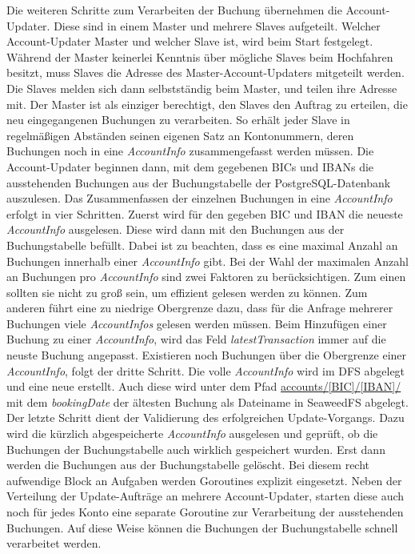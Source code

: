 \documentclass[12pt,oneside,a4paper,parskip]{scrbook}
\begin{document}
Die weiteren Schritte zum Verarbeiten der Buchung übernehmen die Account-Updater. Diese sind in einem Master und mehrere Slaves aufgeteilt. Welcher Account-Updater Master und welcher Slave ist, wird beim Start festgelegt. Während der Master keinerlei Kenntnis über mögliche Slaves beim Hochfahren besitzt, muss Slaves die  Adresse des Master-Account-Updaters mitgeteilt werden. Die Slaves melden sich dann selbstständig beim Master, und teilen ihre Adresse mit. Der Master ist als einziger berechtigt, den Slaves den Auftrag zu erteilen, die neu eingegangenen Buchungen zu verarbeiten. So  erhält jeder Slave in regelmäßigen Abständen seinen eigenen Satz an Kontonummern, deren Buchungen noch in eine \textit{AccountInfo} zusammengefasst werden müssen. Die Account-Updater beginnen dann, mit dem gegebenen BICs und IBANs die ausstehenden Buchungen aus der Buchungstabelle der PostgreSQL-Datenbank auszulesen. Das Zusammenfassen der einzelnen Buchungen in eine \textit{AccountInfo} erfolgt in vier Schritten. Zuerst wird für den gegeben BIC und IBAN die neueste \textit{AccountInfo} ausgelesen. Diese wird dann mit den Buchungen aus der Buchungstabelle befüllt. Dabei ist zu beachten, dass es eine maximal Anzahl an Buchungen innerhalb einer \textit{AccountInfo} gibt. Bei der Wahl der maximalen Anzahl an Buchungen pro \textit{AccountInfo} sind zwei Faktoren zu berücksichtigen. Zum einen sollten sie nicht zu groß sein, um effizient gelesen werden zu können. Zum anderen führt eine zu niedrige Obergrenze dazu, dass für die Anfrage mehrerer Buchungen viele \textit{AccountInfos} gelesen werden müssen. Beim Hinzufügen einer Buchung zu einer \textit{AccountInfo}, wird das Feld \textit{latestTransaction} immer auf die neuste Buchung angepasst. Existieren noch Buchungen über die Obergrenze einer \textit{AccountInfo}, folgt der dritte Schritt. Die volle \textit{AccountInfo} wird im DFS abgelegt und eine neue erstellt. Auch diese wird unter dem Pfad \url{accounts/[BIC]/[IBAN]/} mit dem \textit{bookingDate} der ältesten Buchung als Dateiname in SeaweedFS abgelegt. Der letzte Schritt dient der Validierung des erfolgreichen Update-Vorgangs. Dazu wird die kürzlich abgespeicherte \textit{AccountInfo} ausgelesen und geprüft, ob die Buchungen der Buchungstabelle auch wirklich gespeichert wurden. Erst dann werden die Buchungen aus der Buchungstabelle gelöscht. Bei diesem recht aufwendige Block an Aufgaben werden Goroutines explizit eingesetzt. Neben der Verteilung der Update-Aufträge an mehrere Account-Updater, starten diese auch noch für jedes Konto eine separate Goroutine zur Verarbeitung der ausstehenden Buchungen. Auf diese Weise können die Buchungen der Buchungstabelle schnell verarbeitet werden.
\end{document}
